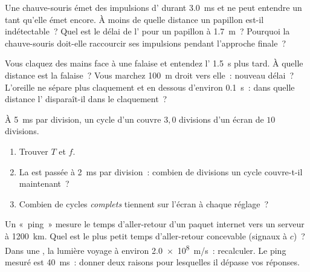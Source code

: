 \begin{exercise}[$\star\star\star$]\label{exo:g10:signals-and-waves:12}
Une chauve-souris émet des impulsions d' durant
\qty{3.0}{ms} et ne peut entendre un  tant qu'elle
émet encore. À moins de quelle distance un papillon est-il
indétectable~? Quel est le délai de l' pour un
papillon à \qty{1.7}{m}~? Pourquoi la chauve-souris doit-elle
raccourcir ses impulsions pendant l'approche finale~?
\end{exercise}

\begin{exercise}[$\star\star\star$]\label{exo:g10:signals-and-waves:13}
Vous claquez des mains face à une falaise et entendez l'
\qty{1.5}{s} plus tard. À quelle distance est la falaise~? Vous
marchez \qty{100}{m} droit vers elle~: nouveau délai~? L'oreille ne
sépare plus claquement et  en dessous d'environ
\qty{0.1}{s}~: dans quelle distance l' disparaît-il
dans le claquement~?
\end{exercise}

\begin{exercise}[$\star\star\star$]\label{exo:g10:signals-and-waves:14}
À \qty{5}{ms} par division, un cycle d'un
 couvre $3{,}0$ divisions d'un écran de $10$
divisions.
\begin{enumerate}
  \item Trouver $T$ et $f$.
  \item La  est passée à \qty{2}{ms} par
        division~: combien de divisions un cycle couvre-t-il
        maintenant~?
  \item Combien de cycles \emph{complets} tiennent sur l'écran à chaque
        réglage~?
\end{enumerate}
\end{exercise}

\begin{exercise}[$\star\star\star$]\label{exo:g10:signals-and-waves:15}
Un «~ping~» mesure le temps d'aller-retour d'un paquet internet vers
un serveur à \qty{1200}{km}. Quel est le plus petit temps d'aller-retour
concevable (signaux à $c$)~? Dans une
, la lumière voyage à environ
\qty{2.0e8}{m/s}~: recalculer. Le ping mesuré est \qty{40}{ms}~: donner
deux raisons pour lesquelles il dépasse vos réponses.
\end{exercise}

